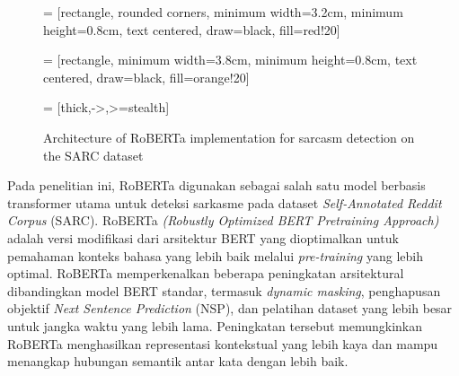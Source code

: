 \begin{figure}[H]
\centering

 = [rectangle, rounded corners,
minimum width=3.2cm,
minimum height=0.8cm,
text centered,
draw=black,
fill=red!20]

 = [rectangle,
minimum width=3.8cm,
minimum height=0.8cm,
text centered,
draw=black,
fill=orange!20]

 = [thick,->,>=stealth]


\caption{Architecture of RoBERTa implementation for sarcasm detection on the SARC dataset}
\label{fig:robertaflow}

\end{figure}

Pada penelitian ini, RoBERTa digunakan sebagai salah satu model berbasis transformer utama untuk deteksi sarkasme pada dataset \textit{Self-Annotated Reddit Corpus} (SARC). RoBERTa \textit{(Robustly Optimized BERT Pretraining Approach)} adalah versi modifikasi dari arsitektur BERT yang dioptimalkan untuk pemahaman konteks bahasa yang lebih baik melalui \textit{pre-training} yang lebih optimal. RoBERTa memperkenalkan beberapa peningkatan arsitektural dibandingkan model BERT standar, termasuk \textit{dynamic masking}, penghapusan objektif \textit{Next Sentence Prediction} (NSP), dan pelatihan dataset yang lebih besar untuk jangka waktu yang lebih lama. Peningkatan tersebut memungkinkan RoBERTa menghasilkan representasi kontekstual yang lebih kaya dan mampu menangkap hubungan semantik antar kata dengan lebih baik.

